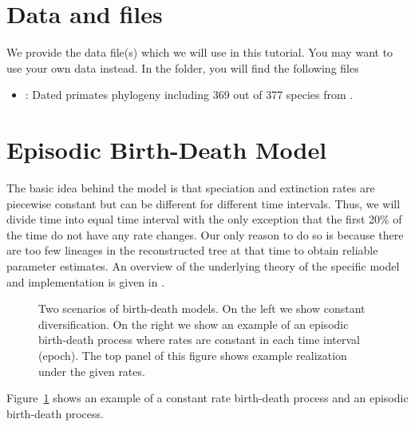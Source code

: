 \section{Data and files}

We provide the data file(s) which we will use in this tutorial.
You may want to use your own data instead.
In the  folder, you will find the following files
\begin{itemize}
\item {}: Dated primates phylogeny including 369 out of 377 species from \cite{Springer2012}.
\end{itemize}




\bigskip
\section{Episodic Birth-Death Model}

The basic idea behind the model is that speciation and extinction rates are piecewise constant but can be different for different time intervals.
Thus, we will divide time into equal time interval with the only exception that the first 20\% of the time do not have any rate changes.
Our only reason to do so is because there are too few lineages in the reconstructed tree at that time to obtain reliable parameter estimates.
An overview of the underlying theory of the specific model and implementation is given in \cite{Hoehna2015a}.
\begin{figure}[h!]
\centering
{}
\caption{\small Two scenarios of birth-death models. On the left we show constant diversification. On the right we show an example of an episodic birth-death process where rates are constant in each time interval (epoch). The top panel of this figure shows example realization under the given rates.}
\label{fig:EBD}
\end{figure}
Figure~\ref{fig:EBD} shows an example of a constant rate birth-death process and an episodic birth-death process.

